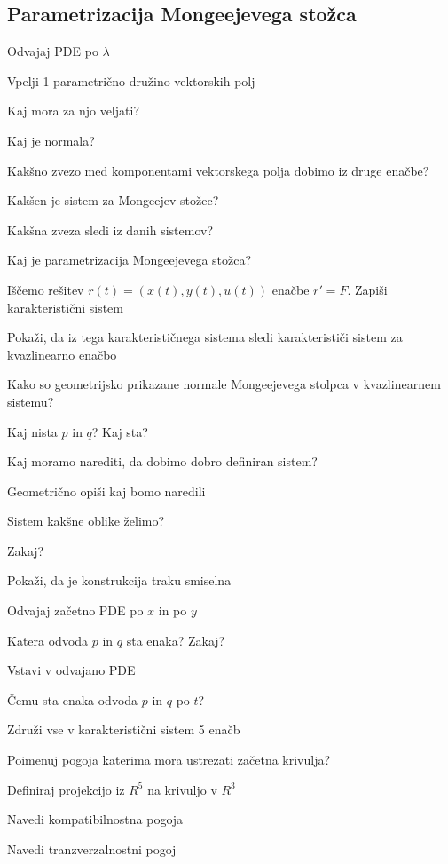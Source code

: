 \documentclass{article}
\begin{document}
    \subsection{Parametrizacija Mongeejevega stožca}
    \begin{enumerate}
        \item Odvajaj PDE po $\lambda$
        {\color{red}\item Vpelji 1-parametrično družino vektorskih polj}
        {\color{red}\item Kaj mora za njo veljati?}
        \item Kaj je normala?
        {\color{red}\item Kakšno zvezo med komponentami vektorskega polja dobimo iz druge enačbe?}
        \item Kakšen je sistem za Mongeejev stožec?
        {\color{red}\item Kakšna zveza sledi iz danih sistemov?}
        \item Kaj je parametrizacija Mongeejevega stožca?
        {\color{red}\item Iščemo rešitev $r(t) = (x(t), y(t), u(t))$ enačbe $r' = F$. Zapiši karakteristični sistem}
        \item Pokaži, da iz tega karakterističnega sistema sledi karakterističi sistem za kvazlinearno enačbo
        {\color{red}\item Kako so geometrijsko prikazane normale Mongeejevega stolpca v kvazlinearnem sistemu?}
        {\color{red}\item Kaj nista $p$ in $q$? Kaj sta?}
        \item Kaj moramo narediti, da dobimo dobro definiran sistem?
        {\color{red}\item Geometrično opiši kaj bomo naredili}
        {\color{red}\item Sistem kakšne oblike želimo?}
        \item Zakaj?
        {\color{red}\item Pokaži, da je konstrukcija traku smiselna}
        \item Odvajaj začetno PDE po $x$ in po $y$
        \item Katera odvoda $p$ in $q$ sta enaka? Zakaj? 
        \item Vstavi v odvajano PDE
        {\color{red}\item Čemu sta enaka odvoda $p$ in $q$ po $t$?}
        \item Združi vse v karakteristični sistem 5 enačb
        \item Poimenuj pogoja katerima mora ustrezati začetna krivulja?
        {\color{red}\item Definiraj projekcijo iz $R^5$ na krivuljo v $R^3$}
        {\color{red}\item Navedi kompatibilnostna pogoja}
        {\color{red}\item Navedi tranzverzalnostni pogoj}
    \end{enumerate}
\end{document}
